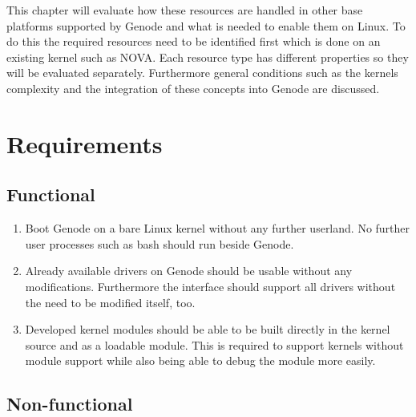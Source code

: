 \documentclass[
a4paper,
12pt,
notitlepage,
parskip=half,
DIV=11,
]{scrbook}
\begin{document}
		This chapter will evaluate how these resources are handled in other base platforms supported by Genode and what is needed to enable them on Linux.
		To do this the required resources need to be identified first which is done on an existing kernel such as NOVA.
		Each resource type has different properties so they will be evaluated separately.
		Furthermore general conditions such as the kernels complexity and the integration of these concepts into Genode are discussed.
		
		\section{Requirements}
		
		
		
		\subsection{Functional}
		
		\begin{enumerate}
			\item \label{req:boot} Boot Genode on a bare  Linux kernel without any further userland.
			No further user processes such as bash should run beside Genode.
			\item \label{req:drivers} Already available drivers on Genode should be usable without any modifications.
			Furthermore the interface should support all drivers without the need to be modified itself, too.
			\item \label{req:modules} Developed kernel modules should be able to be built directly in the kernel source and as a loadable module.
			This is required to support kernels without module support while also being able to debug the module more easily.
		\end{enumerate}
		
		\subsection{Non-functional}
		
\end{document}
